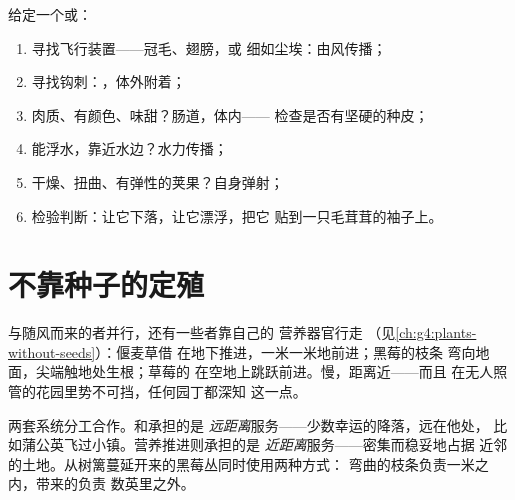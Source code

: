 \begin{method}[从果实判断传播者]\label{met:g6:how-plants-spread:name}
给定一个或：
\begin{enumerate}
  \item 寻找飞行装置——冠毛、翅膀，或
        细如尘埃：由风传播；
  \item 寻找钩刺：，体外附着；
  \item 肉质、有颜色、味甜？肠道，体内——
        检查是否有坚硬的种皮；
  \item 能浮水，靠近水边？水力传播；
  \item 干燥、扭曲、有弹性的荚果？自身弹射；
  \item 检验判断：让它下落，让它漂浮，把它
        贴到一只毛茸茸的袖子上。
\end{enumerate}
\end{method}

\section{不靠种子的定殖}

\begin{example}[地面上的推进]\label{ex:g6:how-plants-spread:vegetative}
与随风而来的者并行，还有一些者靠自己的
营养器官行走
（见\cref{ch:g4:plants-without-seeds}）：偃麦草借
在地下推进，一米一米地前进；黑莓的枝条
弯向地面，尖端触地处生根；草莓的
在空地上跳跃前进。慢，距离近——而且
在无人照管的花园里势不可挡，任何园丁都深知
这一点。
\end{example}

\begin{remark}[双速定殖]\label{rem:g6:how-plants-spread:twospeeds}
两套系统分工合作。和承担的是
\emph{远距离}服务——少数幸运的降落，远在他处，
比如蒲公英飞过小镇。营养推进则承担的是
\emph{近距离}服务——密集而稳妥地占据
近邻的土地。从树篱蔓延开来的黑莓丛同时使用两种方式：
弯曲的枝条负责一米之内，带来的负责
数英里之外。
\end{remark}

